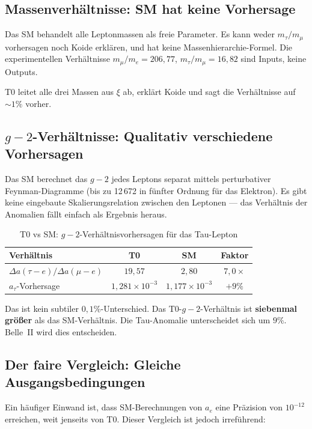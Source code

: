\subsection{Massenverhältnisse: SM hat keine Vorhersage}

Das SM behandelt alle Leptonmassen als freie Parameter. Es kann weder $m_\tau/m_\mu$ vorhersagen noch Koide erklären, und hat keine Massenhierarchie-Formel. Die experimentellen Verhältnisse $m_\mu/m_e = 206{,}77$, $m_\tau/m_\mu = 16{,}82$ sind Inputs, keine Outputs.

T0 leitet alle drei Massen aus $\xi$ ab, erklärt Koide und sagt die Verhältnisse auf $\sim 1\%$ vorher.

\subsection{$g-2$-Verhältnisse: Qualitativ verschiedene Vorhersagen}

Das SM berechnet das $g-2$ jedes Leptons separat mittels perturbativer Feynman-Diagramme (bis zu 12\,672 in fünfter Ordnung für das Elektron). Es gibt keine eingebaute Skalierungsrelation zwischen den Leptonen — das Verhältnis der Anomalien fällt einfach als Ergebnis heraus.

\begin{table}[h]
	\centering
	\begin{tabular}{lccc}
		\toprule
		\textbf{Verhältnis} & \textbf{T0} & \textbf{SM} & \textbf{Faktor} \\
		\midrule
		$\Delta a(\tau{-}e) / \Delta a(\mu{-}e)$ & $19{,}57$ & $2{,}80$ & $7{,}0\times$ \\
		$a_\tau$-Vorhersage & $1{,}281 \times 10^{-3}$ & $1{,}177 \times 10^{-3}$ & $+9\%$ \\
		\bottomrule
	\end{tabular}
	\caption{T0 vs SM: $g-2$-Verhältnisvorhersagen für das Tau-Lepton}
	\label{tab:g2comparison}
\end{table}

Das ist kein subtiler $0{,}1\%$-Unterschied. Das T0-$g-2$-Verhältnis ist \textbf{siebenmal größer} als das SM-Verhältnis. Die Tau-Anomalie unterscheidet sich um $9\%$. Belle~II wird dies entscheiden.

\subsection{Der faire Vergleich: Gleiche Ausgangsbedingungen}

Ein häufiger Einwand ist, dass SM-Berechnungen von $a_e$ eine Präzision von $10^{-12}$ erreichen, weit jenseits von T0. Dieser Vergleich ist jedoch irreführend:


